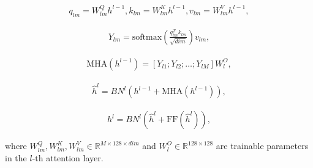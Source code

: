 \documentclass[lettersize,journal]{IEEEtran}
\begin{document}
	\begin{small}
		\begin{equation}\label{encoder1}
			\begin{array}{cc}
				{{q}_{lm}}=W_{lm}^{Q}{{h}^{l-1}},{{k}_{lm}}=W_{lm}^{K}{{h}^{l-1}},{{v}_{lm}}=W_{lm}^{V}{{h}^{l-1}},
			\end{array}
		\end{equation}
		
		\begin{equation}\label{encoder2}
			\begin{array}{cc}
				{{Y}_{lm}}=\text{softmax}\left( \frac{{{q}^{T}_{lm}}{{k}_{lm}}}{\sqrt{dim}} \right){{v}_{lm}},
			\end{array}
		\end{equation}
		
		\begin{equation}\label{encoder3}
			\begin{array}{cc}
				\text{MHA}\left( {{h}^{l-1}} \right)=\left[ {{Y}_{l1}};{{Y}_{l2}};\ldots ;{{Y}_{lM}} \right]W_{l}^{O},
			\end{array}
		\end{equation}
		
		\begin{equation}\label{encoder4}
			\begin{array}{cc}
				{{\hat{h}}^{l}}=B{{N}^{l}}\left( {{h}^{l-1}}+\text{MHA}\left( {{h}^{l-1}} \right) \right),
			\end{array}
		\end{equation}
		
		\begin{equation}\label{encoder5}
			\begin{array}{cc}
				{{h}^{l}}=B{{N}^{l}}\left( {{{\hat{h}}}^{l}}+\text{FF}\left( {{{\hat{h}}}^{l}} \right) \right),
			\end{array}
		\end{equation}
	\end{small}
	where $W_{lm}^{Q},W_{lm}^{K},W_{lm}^{V}\in{{\mathbb{R}}^{M\times 128\times dim}}$ and $W_{l}^{O}\in {{\mathbb{R}}^{128\times 128}}$ are trainable parameters in the $l\text{-th}$ attention layer.
	
\end{document}
